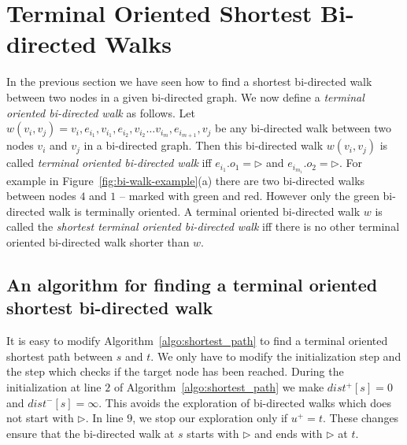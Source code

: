 \documentclass[runningheads]{llncs}
\begin{document}
\section{Terminal Oriented Shortest Bi-directed Walks}
In the previous section we have seen how to find a shortest bi-directed walk between two nodes in 
a given bi-directed graph. We now define a {\em terminal oriented bi-directed walk} as follows. 
Let $w(v_i,v_j) = v_i,e_{i_1},v_{i_1},e_{i_2},v_{i_2}\ldots v_{i_m},e_{i_{m+1}},v_j$ be any 
bi-directed walk between two nodes $v_i$ and $v_j$ in a bi-directed graph. Then this bi-directed
walk $w(v_i,v_j)$ is called {\em terminal oriented bi-directed walk} iff $e_{i_1}.o_1 = \rhd$ and
$e_{i_{m_1}}.o_2 = \rhd$. For example in Figure~\ref{fig:bi-walk-example}(a) there are two bi-directed
walks between nodes $4$ and $1$ -- marked with green and red. However only the green bi-directed walk is terminally oriented. A terminal oriented bi-directed walk
$w$ is called the {\em shortest terminal oriented bi-directed walk} iff there is no other terminal
oriented bi-directed walk shorter than $w$. 

\subsection{An algorithm for finding a terminal oriented shortest bi-directed walk}
It is easy to modify Algorithm~\ref{algo:shortest_path} to find a terminal oriented shortest path
between $s$ and $t$. We only have to modify the initialization step and the step which checks
if the target node has been reached. During the initialization at line $2$ of Algorithm~\ref{algo:shortest_path}
we make $dist^+[s]=0$ and $dist^-[s]=\infty$. This avoids the exploration of bi-directed walks which does
not start with $\rhd$. In line $9$, we stop our exploration only if $u^+=t$. These changes
ensure that the bi-directed walk at $s$ starts with $\rhd$ and ends with $\rhd$ at $t$. 
\end{document}
